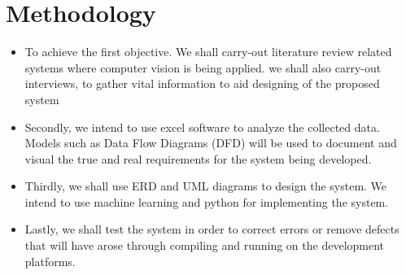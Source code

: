\documentclass[11pt]{article}
\begin{document}
	   \section{\textbf{Methodology}}
	  	\begin{itemize}
	  	\item	To achieve the first objective. We shall carry-out literature review related systems where computer vision is being applied. we shall also carry-out interviews, to gather vital information to aid designing of the proposed system
	  	\item	Secondly, we intend to use excel software to analyze the collected data. Models such as Data Flow Diagrams (DFD) will be used to document and visual the true and real requirements for the system being developed.
	  	\item	Thirdly, we shall use ERD and UML diagrams to design the system. We intend to use machine learning and python for implementing the system.
	  	\item	Lastly, we shall test the system in order to correct errors or remove defects that will have arose through compiling and running on the development platforms.
	  \end{itemize}
	   
	
    	
    	 
       
\end{document}
